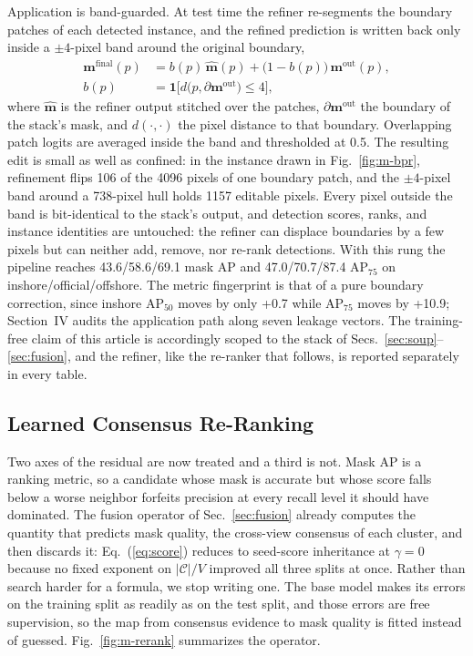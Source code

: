 Application is band-guarded. At test time the refiner re-segments the boundary patches of each detected instance, and the refined prediction is written back only inside a $\pm 4$-pixel band around the original boundary,
\begin{equation}\label{eq:guard}
\begin{split}
\mathbf{m}^{\mathrm{final}}(p)&=b(p)\,\hat{\mathbf{m}}(p)+\bigl(1-b(p)\bigr)\,\mathbf{m}^{\mathrm{out}}(p),\\
b(p)&=\mathbf{1}\bigl[d\bigl(p,\partial\mathbf{m}^{\mathrm{out}}\bigr)\le 4\bigr],
\end{split}
\end{equation}
where $\hat{\mathbf{m}}$ is the refiner output stitched over the patches, $\partial\mathbf{m}^{\mathrm{out}}$ the boundary of the stack's mask, and $d(\cdot,\cdot)$ the pixel distance to that boundary. Overlapping patch logits are averaged inside the band and thresholded at 0.5. The resulting edit is small as well as confined: in the instance drawn in Fig.~\ref{fig:m-bpr}, refinement flips 106 of the 4096 pixels of one boundary patch, and the $\pm 4$-pixel band around a 738-pixel hull holds 1157 editable pixels. Every pixel outside the band is bit-identical to the stack's output, and detection scores, ranks, and instance identities are untouched: the refiner can displace boundaries by a few pixels but can neither add, remove, nor re-rank detections. With this rung the pipeline reaches 43.6/58.6/69.1 mask AP and 47.0/70.7/87.4 AP$_{75}$ on inshore/official/offshore. The metric fingerprint is that of a pure boundary correction, since inshore AP$_{50}$ moves by only +0.7 while AP$_{75}$ moves by +10.9; Section~IV audits the application path along seven leakage vectors. The training-free claim of this article is accordingly scoped to the stack of Secs.~\ref{sec:soup}--\ref{sec:fusion}, and the refiner, like the re-ranker that follows, is reported separately in every table.

\subsection{Learned Consensus Re-Ranking}\label{sec:rerank}

Two axes of the residual are now treated and a third is not. Mask AP is a ranking metric, so a candidate whose mask is accurate but whose score falls below a worse neighbor forfeits precision at every recall level it should have dominated. The fusion operator of Sec.~\ref{sec:fusion} already computes the quantity that predicts mask quality, the cross-view consensus of each cluster, and then discards it: Eq.~(\ref{eq:score}) reduces to seed-score inheritance at $\gamma=0$ because no fixed exponent on $|\mathcal{C}|/V$ improved all three splits at once. Rather than search harder for a formula, we stop writing one. The base model makes its errors on the training split as readily as on the test split, and those errors are free supervision, so the map from consensus evidence to mask quality is fitted instead of guessed. Fig.~\ref{fig:m-rerank} summarizes the operator.

